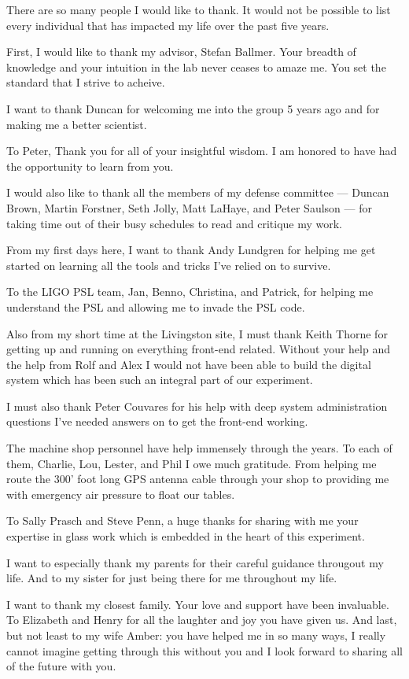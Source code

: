 There are so many people I would like to thank.
It would not be possible to list every individual that has impacted my life
over the past five years.

First, I would like to thank my advisor, Stefan Ballmer. Your
breadth of knowledge and your intuition in the lab never ceases to amaze me.
You set the standard that I strive to acheive.

I want to thank Duncan for welcoming me into the group 5 years ago and for
making me a better scientist.

To Peter, Thank you for all of your insightful wisdom. I am honored to have
had the opportunity to learn from you.

I would also like to thank all the members of my defense committee --- 
Duncan Brown, Martin Forstner, Seth Jolly, Matt LaHaye, and Peter Saulson ---
for taking time out of their busy schedules to read and critique my work.

From my first days here, I want to thank Andy Lundgren for helping me get
started on learning all the tools and tricks I've relied on to survive.

To the LIGO PSL team, Jan, Benno, Christina, and Patrick, for helping me
understand the PSL and allowing me to invade the PSL code.

Also from my short time at the Livingston site, I must thank Keith Thorne for
getting up and running on everything front-end related. Without your help and
the help from Rolf and Alex I would not have been able to build the digital
system which has been such an integral part of our experiment.

I must also thank Peter Couvares for his help with deep system administration
questions I've needed answers on to get the front-end working.

The machine shop personnel have help immensely through the years. To each of
them, Charlie, Lou, Lester, and Phil I owe much gratitude. From helping me
route the 300' foot long GPS antenna cable through your shop to
providing me with emergency air pressure to float our tables.

To Sally Prasch and Steve Penn, a huge thanks for sharing with me your
expertise in glass work which is embedded in the heart of this experiment.

I want to especially thank my parents for their careful guidance througout my
life. And to my sister for just being there for me throughout my life.

I want to thank my closest family. Your love and support have been invaluable.
To Elizabeth and Henry for all the laughter and joy you have given us.
And last, but not least to my wife Amber: you have helped me in so many ways,
I really cannot imagine getting through this without you and I look forward to
sharing all of the future with you.



